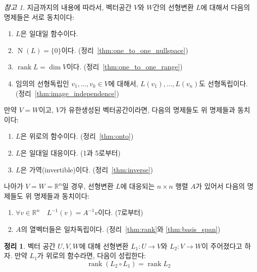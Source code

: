 \documentclass[unfonts,oneside,a4paper]{oblivoir}
\makeatletter
\theoremstyle{definition}
\theoremstyle{theorem}
\newtheorem{theorem}[definition]{정리}
\theoremstyle{theorem}
\theoremstyle{remark}
\newtheorem*{remark}{참고}
\theoremstyle{remark}
\theoremstyle{remark}
\theoremstyle{remark}
\renewcommand{\vec}[1]{\bm{\mathit{#1}}}
\newcommand{\vecz}{\bm{\mathrm{0}}}
\DeclareMathOperator{\Null}{N}
\DeclareMathOperator{\rank}{rank}
\newcommand\nextitem[1]{%
    \setcounter{\@enumctr}{#1}%
    \addtocounter{\@enumctr}{-1}%
}
\makeatother
\begin{document}
\begin{remark} \label{page:equiv_remark}
    지금까지의 내용에 따라서, 벡터공간 $V$와 $W$간의 선형변환 $L$에 대해서 다음의 명제들은 서로 동치이다:
    \begin{enumerate}
        \item $L$은 일대일 함수이다.
        \item $\Null(L) = \{\vecz\}$이다. (정리~\ref{thm:one_to_one_nullspace})
        \item $\rank L = \dim V$이다. (정리~\ref{thm:one_to_one_range})
        \item 임의의 선형독립인 $\vec v_1, \dots, \vec v_k \in V$에 대해서, $L(\vec v_1), \dots, L(\vec v_n)$도 선형독립이다. (정리~\ref{thm:image_independence})
    \end{enumerate}

    만약 $V = W$이고, $V$가 유한생성된 벡터공간이라면, 다음의 명제들도 위 명제들과 동치이다:
    \begin{enumerate}
        \nextitem{5}
        \item $L$은 위로의 함수이다. (정리~\ref{thm:onto})
        \item $L$은 일대일 대응이다. (1과 5로부터)
        \item $L$은 가역(invertible)이다. (정리~\ref{thm:inverse})
    \end{enumerate}

    나아가 $V = W = \mathbb R^n$일 경우, 선형변환 $L$에 대응되는 $n \times n$ 행렬 $A$가 있어서 다음의 명제들도 위 명제들과 동치이다:
    \begin{enumerate}
        \nextitem{8}
        \item $\forall \vec v \in \mathbb R^n \quad L^{-1}(\vec v) = A^{-1} \vec v$이다. (7로부터)
        \item $A$의 열벡터들은 일차독립이다. (정리~\ref{thm:rank}와 \ref{thm:basis_span})
    \end{enumerate}
\end{remark}

\begin{theorem}
    벡터 공간 $U, V, W$에 대해 선형변환 $L_1: U \rightarrow V$와 $L_2: V \rightarrow W$이 주어졌다고 하자.
    만약 $L_1$가 위로의 함수라면, 다음이 성립한다:
    \begin{equation*}
        \rank (L_2 \circ L_1) = \rank L_2
    \end{equation*}
\end{theorem}
\end{document}
